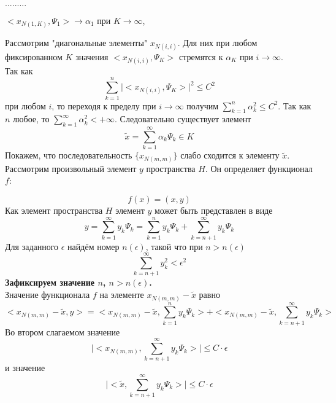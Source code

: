 \documentclass[12pt,a4paper,titlepage, oneside]{book}
\theoremstyle{definition}
\theoremstyle{plain}
\theoremstyle{remark}
\theoremstyle{remark}
\theoremstyle{remark}
\theoremstyle{remark}
\theoremstyle{plain}
\theoremstyle{plain}
\begin{document}
 \begin{center}
 $.........$
 \end{center}
 \begin{center}
 $<x_{N(1,K)},\Psi_{1}> \to \alpha_{1}$ при
 $K\to\infty$, 
 \end{center}
 Рассмотрим "диагональные элементы" $ x_{N(i,i)}$. Для них при любом фиксированном $K$ значения 
 $<x_{N(i,i)},\Psi_K>$ стремятся к $\alpha_K$ при 
$i \to \infty$.\\
Так как
\begin{equation*}
 \sum\limits_{k=1}^n 
{\vert<x_{N(i,i)},\Psi_K> \vert}^2 \leq C^2
\end{equation*}
  при любом $i$, то переходя к пределу при $i\to\infty$ получим $\sum\limits_{k=1}^n \alpha_k^2 \leq C^2$. Так как $n$ любое, то $\sum\limits_{k=1}^\infty \alpha_k^2 <+\infty$. Следовательно существует элемент 
\begin{equation*}
\widetilde{x}= \sum\limits_{k=1}^\infty 
\alpha_k\Psi_{k} \in K
\end{equation*}
Покажем, что последовательность
 $\lbrace x_{N(m,m)} \rbrace$
 слабо сходится к элементу $\widetilde{x}$.\\
 Рассмотрим произвольный элемент $y$ пространства 
 $H$. Он определяет функционал $f$:
 
\begin{equation*}
f(x)=(x,y)
\end{equation*}
Как элемент пространства $H$ элемент $y$ может быть представлен в виде 
\begin{equation*}
y=\sum\limits_{k=1}^\infty y_k\Psi_k =
\sum\limits_{k=1}^n y_k\Psi_k +
\sum\limits_{k=n+1}^\infty y_k\Psi_k
\end{equation*}
Для заданного $\epsilon$ найдём номер $n(\epsilon)$, такой что при $n>n(\epsilon)$
\begin{equation*}
\sum\limits_{k=n+1}^\infty y_k^2 < {\epsilon}^2 
\end{equation*}
\textbf{Зафиксируем значение $n$, $n>n(\epsilon)$.}\\

Значение функционала $f$ на элементе $x_{N(m,m)}-\widetilde{x}$ равно
\begin{equation*}
<x_{N(m,m)}-\widetilde{x},y>= 
<x_{N(m,m)}-\widetilde{x},\sum\limits_{k=1}^n y_k\Psi_k>+
<x_{N(m,m)}-\widetilde{x},\sum\limits_{k=n+1}^\infty y_k\Psi_k>
\end{equation*}
Во втором слагаемом значение
\begin{equation*}
\vert <x_{N(m,m)},\sum\limits_{k=n+1}^\infty y_k\Psi_k> \vert \leq
C\cdot\epsilon
\end{equation*}
и значение 
\begin{equation*}
\vert <\widetilde{x},\sum\limits_{k=n+1}^\infty y_k\Psi_k> \vert \leq
C\cdot\epsilon
\end{equation*}
\end{document}
